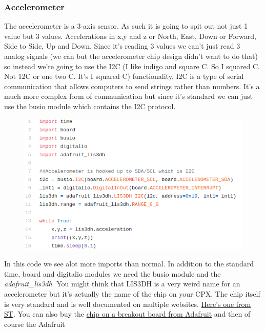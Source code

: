 {\subsubsection{Accelerometer}
\label{s:modules}
The accelerometer is a 3-axis sensor. As such it is going to spit out
not just 1 value but 3 values. Accelerations in x,y and z or North,
East, Down or Forward, Side to Side, Up and Down. Since it’s reading 3
values we can’t just read 3 analog signals (we can but the
accelerometer chip design didn’t want to do that) so instead we’re
going to use the I2C (I like indigo and square C. So I squared C. Not
12C or one two C. It’s I squared C) functionality. I2C is a type of
serial communication that allows computers to send strings rather than
numbers. It’s a much more complex form of communication but since it’s
standard we can just use the busio module which contains the I2C
protocol. 
\begin{figure}[H]
  \begin{center}
    \includegraphics[width=\textwidth]{Figures/accelerometer_code.png}
  \end{center}
\end{figure}
In this code we see alot more imports than normal. In addition to the
standard time, board and digitalio modules we need the busio module
and the {\it adafruit\_lis3dh}. You might think that LIS3DH is a very
weird name for an accelerometer but it’s actually the name of the chip
on your CPX. The chip itself is very standard and is well documented
on multiple
websites. \href{https://www.st.com/en/mems-and-sensors/lis3dh.html}{Here’s
one from ST}. You can also buy
the \href{https://www.adafruit.com/product/2809?gclid=EAIaIQobChMI98qfjrC86gIVEI_ICh2JtQ-JEAAYAiAAEgJ2_fD_BwE}{chip
on a breakout board from Adafruit} and then of course the Adafruit
}
